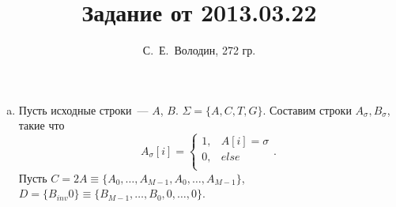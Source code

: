 \documentclass[a4paper]{article}
\title{Задание от 2013.03.22}
\author{С.~Е.~Володин, 272 гр.}
\date{}
\begin{document}
\maketitle
\begin{enumerate}[(a)]
\item Пусть исходные строки~--- $A$, $B$. $\Sigma=\{A,C,T,G\}$. Составим строки $A_\sigma, B_\sigma$, такие что $$A_\sigma[i]=\left\{\begin{array}{lcr}1, & A[i]=\sigma\\ 0, & else\\ \end{array}. \right.$$ Пусть $C=2A\equiv\{A_0,\dots,A_{M-1},A_0,\dots,A_{M-1}\}$, $D=\{B_{inv}0\}\equiv\{B_{M-1},\dots,B_0,0,\dots,0\}$.
\end{enumerate}
\end{document}
